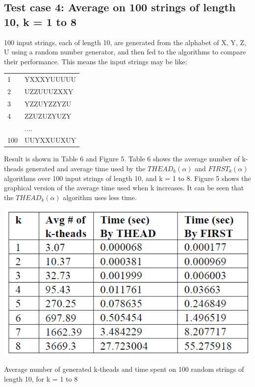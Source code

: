 \documentclass{sig-alternate-05-2015}
\begin{document}
\subsection{Test case 4: Average on 100 strings of length 10, k
= 1 to 8}
100 input strings, each of length 10, are generated from the
alphabet of {X, Y, Z, U} using a random number generator,
and then fed to the algorithms to compare their performance.
This means the input strings may be like:
\begin{tabular}{ll}
1   & YXXXYUUUUU                                                                                                   \\
2   & UZZUUUZXXY                                                                                                  \\
3   & YZZUYZZYZU                                                                                                \\
4   & ZZUZUZYUZY                                                                                                \\
    & ....                                                                                                \\
100 &UUYXXUUXUY \\
\end{tabular}

Result is shown in Table 6 and Figure 5. Table 6 shows
the average number of k-theads generated and average time
used by the $THEAD_k(\alpha)$ and $FIRST_k(\alpha)$ algorithms over
100 input strings of length 10, and k = 1 to 8. Figure 5
shows the graphical version of the average time used when
k increases. It can be seen that the $THEAD_k(\alpha)$ algorithm
uses less time.

\begin{table}
\centering
\includegraphics[scale=0.5]{table6.PNG}
\caption{Average number of generated k-theads and time
spent on 100 random strings of length 10, for k = 1 to 8}
\label{table:6}
\end{table}
\end{document}
